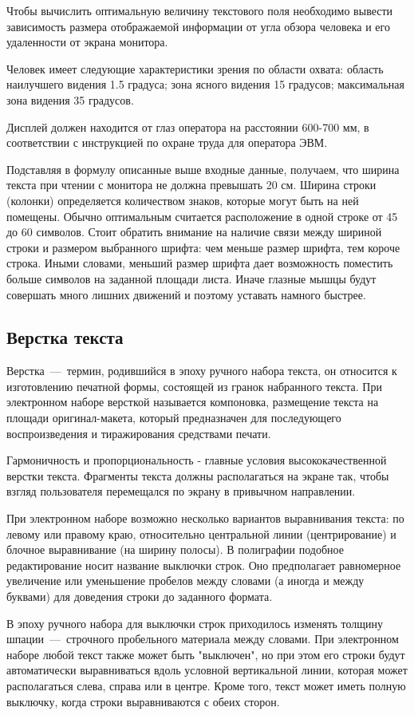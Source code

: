 \documentclass[14pt]{extarticle}
\begin{document}
Чтобы вычислить оптимальную величину текстового поля необходимо вывести зависимость размера отображаемой информации от угла обзора человека и его удаленности от экрана монитора.

Человек имеет следующие характеристики зрения по области охвата: область наилучшего видения 1.5 градуса; зона ясного видения 15 градусов; максимальная зона видения 35 градусов.

Дисплей должен находится от глаз оператора на расстоянии 600-700 мм, в соответствии с инструкцией по охране труда для оператора ЭВМ.

Подставляя в формулу описанные выше входные данные, получаем, что ширина текста при чтении с монитора не должна превышать 20 см. Ширина строки (колонки) определяется количеством знаков, которые могут быть на ней помещены. Обычно оптимальным считается расположение в одной строке от 45 до 60 символов. Стоит обратить внимание на наличие связи между шириной строки и размером выбранного шрифта: чем меньше размер шрифта, тем короче строка. Иными словами, меньший размер шрифта дает возможность поместить больше символов на заданной площади листа. Иначе глазные мышцы будут совершать много лишних движений и поэтому уставать намного быстрее.

\subsection{Верстка текста}

Верстка~---~термин, родившийся в эпоху ручного набора текста, он относится к изготовлению печатной формы, состоящей из гранок набранного текста. При электронном наборе версткой называется компоновка, размещение текста на площади оригинал-макета, который предназначен для последующего воспроизведения и тиражирования средствами печати.

Гармоничность и пропорциональность - главные условия высококачественной верстки текста. Фрагменты текста должны располагаться на экране так, чтобы взгляд пользователя перемещался по экрану в привычном направлении.

При электронном наборе возможно несколько вариантов выравнивания текста: по левому или правому краю, относительно центральной линии (центрирование) и блочное выравнивание (на ширину полосы). В полиграфии подобное редактирование носит название выключки строк. Оно предполагает равномерное увеличение или уменьшение пробелов между словами (а иногда и между буквами) для доведения строки до заданного формата.

В эпоху ручного набора для выключки строк приходилось изменять толщину шпации~---~строчного пробельного материала между словами. При электронном наборе любой текст также может быть "выключен", но при этом его строки будут автоматически выравниваться вдоль условной вертикальной линии, которая может располагаться слева, справа или в центре. Кроме того, текст может иметь полную выключку, когда строки выравниваются с обеих сторон.
\end{document}
